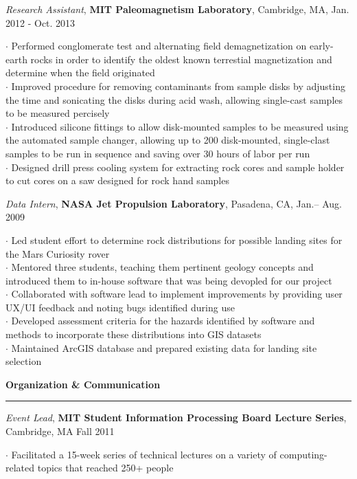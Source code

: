 \documentclass[11pt]{article}
\begin{document}
\smallskip
\emph {Research Assistant}, \textbf {MIT Paleomagnetism Laboratory}, Cambridge, MA, Jan. 2012 - Oct. 2013 \\ 
\begin{small}$\cdot$ {Performed conglomerate test and alternating field demagnetization on early-earth rocks in order to identify the oldest known terrestial magnetization and determine when the field originated} \\
$\cdot$ {Improved procedure for removing contaminants from sample disks by adjusting the time and sonicating the disks during acid wash, allowing single-cast samples to be measured percisely} \\
$\cdot$ {Introduced silicone fittings to allow disk-mounted samples to be measured using the automated sample changer, allowing up to 200 disk-mounted, single-clast samples to be run in sequence and saving over 30 hours of labor per run} \\
$\cdot$ {Designed drill press cooling system for extracting rock cores and sample holder to cut cores on a saw designed for rock hand samples}\end{small}

\smallskip
\emph{Data Intern}, \textbf{NASA Jet Propulsion Laboratory}, Pasadena, CA, Jan.-- Aug. 2009 \\
\begin{small}$\cdot$ {Led student effort to determine rock distributions for possible landing sites for the Mars Curiosity rover }\\
$\cdot$ {Mentored three students, teaching them pertinent geology concepts and introduced them to in-house software that was being devopled for our project }\\
$\cdot$ {Collaborated with software lead to implement improvements by providing user UX/UI feedback and noting bugs identified during use }\\
$\cdot$ {Developed assessment criteria for the hazards identified by software and methods to incorporate these distributions into GIS datasets }\\
$\cdot$ {Maintained ArcGIS database and prepared existing data for landing site selection }\end{small}

\vspace*{0.25 mm}
\textbf{Organization \& Communication}
\smallskip
\hrule
\emph{Event Lead}, \textbf{MIT Student Information Processing Board Lecture Series}, Cambridge, MA Fall 2011\\
\begin{small}$\cdot$ {Facilitated a 15-week series of technical lectures on a variety of computing-related topics that reached 250+ people}\end{small}
\end{document}
